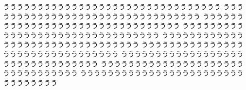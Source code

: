 \begin{breakbox}
うううううううううううううううううううううううううううううううう
うううううううううううううううううううううううううううううううう
うううううううううううううううううううううううううううううううう
うううううううううううううううううううううううううううううううう
うううううううううううううううううううううううううううううううう
うううううううううううううううううううううううううううううううう
うううううううううううううううううううううううううううううううう
うううううううううううううううううううううううううううううううう
うううううううううううううううううううううううううううううううう
\end{breakbox}
